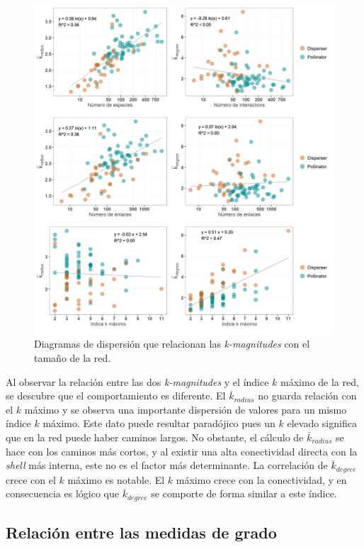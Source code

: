 \begin{figure}[h!]
\centering
\includegraphics[scale=0.55]{Figures/ESTATICA_tamanyo_kdegree_kradius.png}
\caption{Diagramas de dispersión que relacionan las \textit{k-magnitudes} con el tamaño de la red.}
\label{fig:ESTATICA_tamanyo_kdegree_kradius}
\end{figure}

Al observar la relación entre las dos \textit{k-magnitudes} y el índice $k$ máximo de la red, se descubre que el comportamiento es diferente. El $\overline{k}_{radius}$ no guarda relación con el $k$ máximo y se observa una importante dispersión de valores para un mismo índice $k$ máximo. Este dato puede resultar paradójico pues un $k$ elevado significa que en la red puede haber caminos largos. No obstante, el cálculo de $\overline{k}_{radius}$ se hace con los caminos más cortos, y al existir una alta conectividad directa con la \textit{shell} más interna, este no es el factor más determinante. La correlación de $\overline{k}_{degree}$ crece con el $k$ máximo es notable. El $k$ máximo crece con la conectividad, y en consecuencia es lógico que $\overline{k}_{degree}$ se comporte de forma similar a este índice.

\subsection{Relación entre las medidas de grado}

